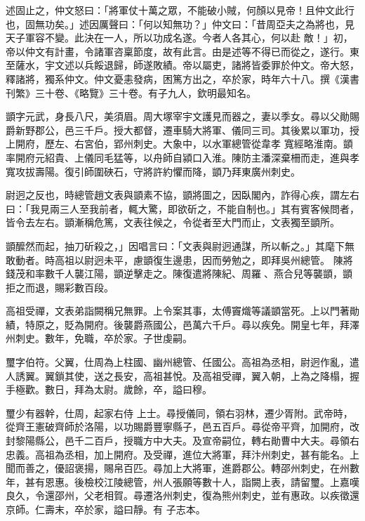 \begin{pinyinscope}
 述固止之，仲文怒曰：「將軍仗十萬之眾，不能破小賊，何顏以見帝！且仲文此行也，固無功矣。」述因厲聲曰：「何以知無功？」仲文曰：「昔周亞夫之為將也，見天子軍容不變。此決在一人，所以功成名遂。今者人各其心，何以赴
 敵！」初，帝以仲文有計畫，令諸軍咨稟節度，故有此言。由是述等不得已而從之，遂行。東至薩水，宇文述以兵餒退歸，師遂敗績。帝以屬吏，諸將皆委罪於仲文。帝大怒，釋諸將，獨系仲文。仲文憂恚發病，困篤方出之，卒於家，時年六十八。撰《漢書刊繁》三十卷、《略覽》三十卷。有子九人，欽明最知名。



 顗字元武，身長八尺，美須眉。周大塚宰宇文護見而器之，妻以季女。尋以父勛賜爵新野郡公，邑三千戶。授大都督，遷車騎大將軍、儀同三司。其後累以軍功，授上開府，歷左、右宮伯，郢州刺史。大象中，以水軍總管從韋孝
 寬經略淮南。顗率開府元紹貴、上儀同毛猛等，以舟師自潁口入淮。陳防主潘深棄柵而走，進與孝寬攻拔壽陽。復引師圍硤石，守將許約懼而降，顗乃拜東廣州刺史。



 尉迥之反也，時總管趙文表與顗素不協，顗將圖之，因臥閣內，詐得心疾，謂左右曰：「我見兩三人至我前者，輒大驚，即欲斫之，不能自制也。」其有賓客候問者，皆令去左右。顗漸稱危篤，文表往候之，令從者至大門而止，文表獨至顗所。



 顗醿然而起，抽刀斫殺之，」因唱言曰：「文表與尉迥通謀，所以斬之。」其麾下無敢動者。時高祖以尉迥未平，慮顗復生邊患，因而勞勉之，即拜吳州總管。
 陳將錢茂和率數千人襲江陽，顗逆擊走之。陳復遣將陳紀、周羅、燕合兒等襲顗，顗拒之而退，賜彩數百段。



 高祖受禪，文表弟詣闕稱兄無罪。上令案其事，太傅竇熾等議顗當死。上以門著勛績，特原之，貶為開府。後襲爵燕國公，邑萬六千戶。尋以疾免。開皇七年，拜澤州刺史。數年，免職，卒於家。子世虔嗣。



 璽字伯符。父翼，仕周為上柱國、幽州總管、任國公。高祖為丞相，尉迥作亂，遣人誘翼。翼鎖其使，送之長安，高祖甚悅。及高祖受禪，翼入朝，上為之降榻，握手極歡。數日，拜為太尉。歲餘，卒，謚曰穆。



 璽少有器幹，仕周，起家右侍
 上士。尋授儀同，領右羽林，遷少胥附。武帝時，從齊王憲破齊師於洛陽，以功賜爵豐寧縣子，邑五百戶。尋從帝平齊，加開府，改封黎陽縣公，邑千二百戶，授職方中大夫。及宣帝嗣位，轉右勛曹中大夫。尋領右忠義。高祖為丞相，加上開府。及受禪，進位大將軍，拜汴州刺史，甚有能名。上聞而善之，優詔褒揚，賜帛百匹。尋加上大將軍，進爵郡公。轉邵州刺史，在州數年，甚有恩惠。後檢校江陵總管，州人張願等數十人，詣闕上表，請留璽。上嘉嘆良久，令還邵州，父老相賀。尋遷洛州刺史，復為熊州刺史，並有惠政。以疾徵還京師。仁壽末，卒於家，謚曰靜。有
 子志本。




\end{pinyinscope}
